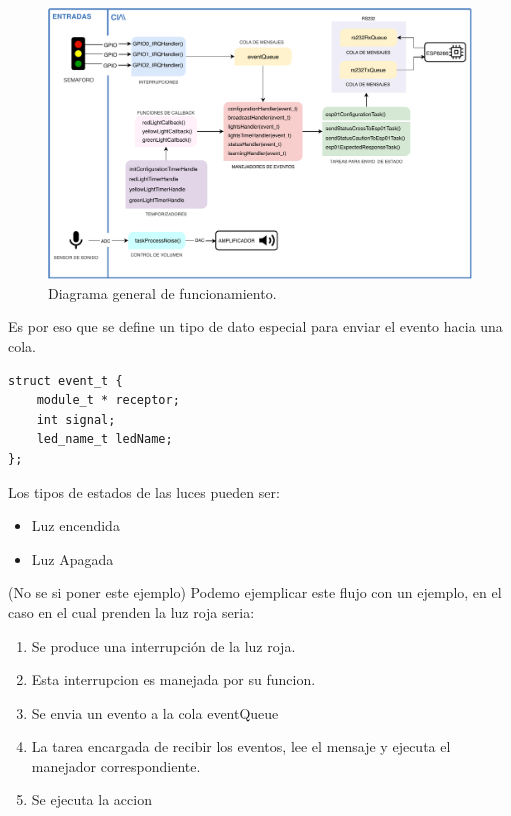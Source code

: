 \begin{figure}[H]
	\centering
	\includegraphics[scale=.6]{./Figures/generalWorkFlow.pdf}
	\caption{Diagrama general de funcionamiento.}
	\label{fig:generalWorkFlow}
\end{figure}

Es por eso que se define un tipo de dato especial para enviar el evento hacia una cola.

\lstset{language=C, breaklines=true, basicstyle=\footnotesize}
\begin{lstlisting}
struct event_t {
	module_t * receptor;
	int signal;
	led_name_t ledName;
};
\end{lstlisting}

Los tipos de estados de las luces pueden ser:

\begin{itemize}
\item Luz encendida
\item Luz Apagada
\end{itemize}

(No se si poner este ejemplo)
Podemo ejemplicar este flujo con un ejemplo, en el caso en el cual prenden la luz roja seria:
\begin{enumerate}
\item Se produce una interrupción de la luz roja.
\item Esta interrupcion es manejada por su funcion.
\item Se envia un evento a la cola eventQueue
\item La tarea encargada de recibir los eventos, lee el mensaje y ejecuta el manejador correspondiente.
\item Se ejecuta la accion
\end{enumerate}

